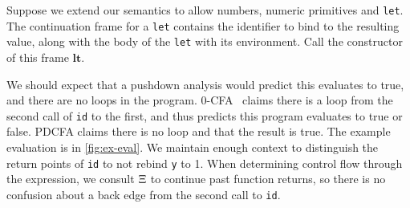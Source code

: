 Suppose we extend our semantics to allow numbers, numeric primitives and \texttt{let}.
%
The continuation frame for a \texttt{let} contains the identifier to bind to the resulting value, along with the body of the \texttt{let} with its environment.
%
Call the constructor of this frame $\mathbf{lt}$.

We should expect that a pushdown analysis would predict this evaluates to true, and there are no loops in the program.
%
0-CFA~\citep{dvanhorn:Shivers:1991:CFA} claims there is a loop from the second call of \texttt{id} to the first, and thus predicts this program evaluates to true or false.
%
PDCFA claims there is no loop and that the result is true.
%
The example evaluation is in \autoref{fig:ex-eval}.
%
We maintain enough context to distinguish the return points of \texttt{id} to not rebind \texttt{y} to 1.
%
When determining control flow through the expression, we consult $\Xi$ to continue past function returns, so there is no confusion about a back edge from the second call to \texttt{id}.
%


